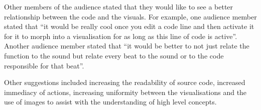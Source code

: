 Other members of the audience stated that they would like to see a better relationship between the code and the visuals. For example, one audience member stated that ``it would be really cool once you edit a code line and then activate it for it to morph into a visualisation for as long as this line of code is active''. Another audience member stated that ``it would be better to not just relate the function to the sound but relate every beat to the sound or to the code responsible for that beat''.

Other suggestions included increasing the readability of source code, increased immediacy of actions, increasing uniformity between the visualisations and the use of images to assist with the understanding of high level concepts.










